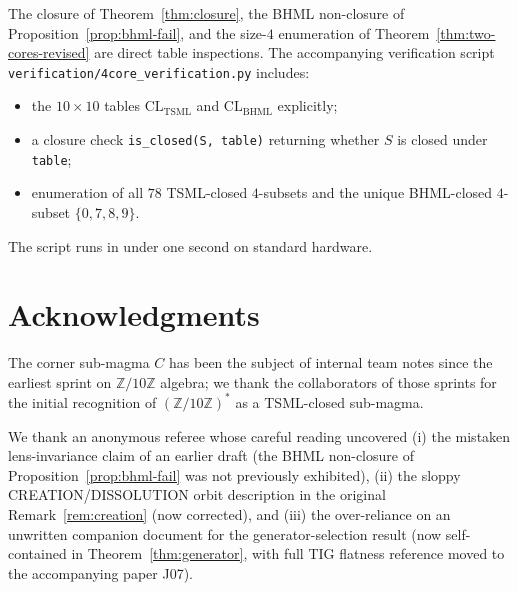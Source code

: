 \documentclass[11pt,reqno]{amsart}
\theoremstyle{plain}
\theoremstyle{definition}
\theoremstyle{remark}
\newcommand{\Z}{\mathbb{Z}}
\newcommand{\TSML}{\mathrm{TSML}}
\newcommand{\BHML}{\mathrm{BHML}}
\begin{document}
The closure of Theorem~\ref{thm:closure}, the BHML non-closure of
Proposition~\ref{prop:bhml-fail}, and the size-$4$ enumeration of
Theorem~\ref{thm:two-cores-revised} are direct table inspections.
The accompanying verification script \texttt{verification/4core\_verification.py}
includes:
\begin{itemize}
\item the $10 \times 10$ tables $\mathrm{CL}_\TSML$ and
$\mathrm{CL}_\BHML$ explicitly;
\item a closure check
\texttt{is\_closed(S, table)} returning whether $S$ is closed under
\texttt{table};
\item enumeration of all $78$ TSML-closed $4$-subsets and the unique
BHML-closed $4$-subset $\{0, 7, 8, 9\}$.
\end{itemize}
The script runs in under one second on standard hardware.

\section*{Acknowledgments}

The corner sub-magma $C$ has been the subject of internal team notes
since the earliest sprint on $\Z/10\Z$ algebra; we thank the
collaborators of those sprints for the initial recognition of
$(\Z/10\Z)^*$ as a TSML-closed sub-magma.

We thank an anonymous referee whose careful reading uncovered (i) the
mistaken lens-invariance claim of an earlier draft (the BHML
non-closure of Proposition~\ref{prop:bhml-fail} was not previously
exhibited), (ii) the sloppy CREATION/DISSOLUTION orbit description
in the original Remark~\ref{rem:creation} (now corrected), and
(iii) the over-reliance on an unwritten companion document for the
generator-selection result (now self-contained in
Theorem~\ref{thm:generator}, with full TIG flatness reference moved
to the accompanying paper \cite{SandersTIG} J07).
\end{document}
